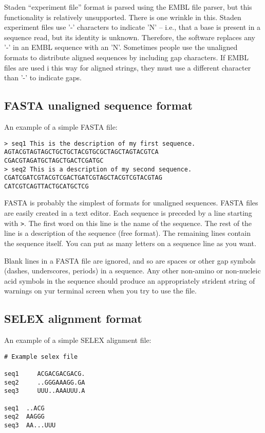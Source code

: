 Staden ``experiment file'' format is parsed using the EMBL file
parser, but this functionality is relatively unsupported. There is one
wrinkle in this. Staden experiment files use '-' characters to
indicate 'N' -- i.e., that a base is present in a sequence read, but
its identity is unknown. Therefore, the software replaces any '-' in
an EMBL sequence with an 'N'. Sometimes people use the unaligned
formats to distribute aligned sequences by including gap
characters. If EMBL files are used i this way for aligned strings,
they must use a different character than '-' to indicate gaps.

\subsection{FASTA unaligned sequence format}

An example of a simple FASTA file: 

\begin{verbatim}
> seq1 This is the description of my first sequence.
AGTACGTAGTAGCTGCTGCTACGTGCGCTAGCTAGTACGTCA
CGACGTAGATGCTAGCTGACTCGATGC
> seq2 This is a description of my second sequence.
CGATCGATCGTACGTCGACTGATCGTAGCTACGTCGTACGTAG
CATCGTCAGTTACTGCATGCTCG
\end{verbatim}

FASTA is probably the simplest of formats for unaligned sequences.
FASTA files are easily created in a text editor.  Each sequence is
preceded by a line starting with \verb+>+. The first word on this line
is the name of the sequence. The rest of the line is a description of
the sequence (free format). The remaining lines contain the sequence
itself. You can put as many letters on a sequence line as you want.

Blank lines in a FASTA file are ignored, and so are spaces or other
gap symbols (dashes, underscores, periods) in a sequence. Any other
non-amino or non-nucleic acid symbols in the sequence should produce
an appropriately strident string of warnings on yur terminal screen
when you try to use the file.

\subsection{SELEX alignment format}

An example of a simple SELEX alignment file:

\begin{verbatim}
# Example selex file

seq1     ACGACGACGACG.
seq2     ..GGGAAAGG.GA
seq3     UUU..AAAUUU.A

seq1  ..ACG
seq2  AAGGG
seq3  AA...UUU
\end{verbatim}

